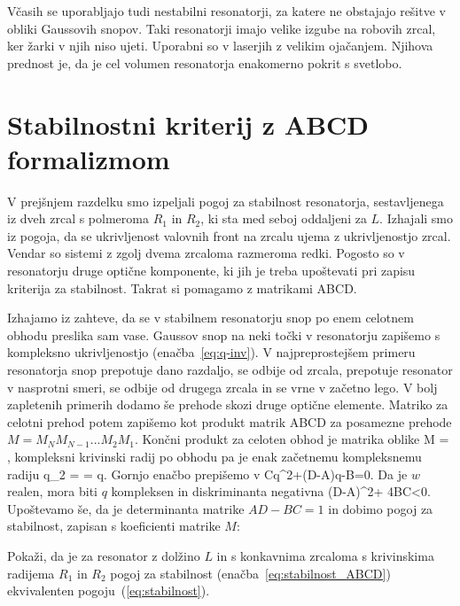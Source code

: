 \begin{remark}
Včasih se uporabljajo tudi nestabilni resonatorji, za 
katere ne obstajajo rešitve v obliki Gaussovih snopov. Taki resonatorji 
imajo velike izgube na robovih zrcal, ker žarki v njih niso ujeti. 
Uporabni so v laserjih z velikim ojačanjem. Njihova prednost je, da je cel
volumen resonatorja enakomerno pokrit s svetlobo.
\end{remark}

\section{Stabilnostni kriterij z ABCD formalizmom}
V prejšnjem razdelku smo izpeljali pogoj za stabilnost resonatorja, 
sestavljenega iz dveh zrcal s polmeroma $R_1$ in $R_2$, ki sta med 
seboj oddaljeni za $L$. Izhajali smo iz pogoja, da se ukrivljenost
valovnih front na zrcalu ujema z ukrivljenostjo zrcal. Vendar so sistemi z
zgolj dvema zrcaloma razmeroma redki. Pogosto so v resonatorju
druge optične komponente, ki jih je treba upoštevati pri zapisu
kriterija za stabilnost. Takrat si pomagamo z matrikami ABCD. 

Izhajamo iz zahteve, da se v stabilnem resonatorju snop po enem celotnem obhodu
preslika sam vase. Gaussov snop na neki točki v resonatorju 
zapišemo s kompleksno ukrivljenostjo (enačba~\ref{eq:q-inv}).
V najpreprostejšem primeru resonatorja snop prepotuje dano razdaljo, se odbije od zrcala, prepotuje
resonator v nasprotni smeri, se odbije od drugega zrcala in se vrne v začetno lego. V bolj 
zapletenih primerih dodamo še prehode skozi druge optične elemente. Matriko 
za celotni prehod potem zapišemo kot produkt matrik ABCD za posamezne prehode $M = M_N M_{N-1} ...M_2 M_1$.
Končni produkt za celoten obhod je matrika oblike
\beq
M = \left[\begin{array}{cc}
A & B\\
C & D
\end{array}\right],
\eeq
kompleksni krivinski radij po obhodu pa je enak začetnemu kompleksnemu radiju
\beq
q_2 =  = q.
\eeq
Gornjo enačbo prepišemo v 
\beq
Cq^2+(D-A)q-B=0.
\eeq
Da je $w$ realen, mora biti $q$ kompleksen in diskriminanta negativna
\beq
(D-A)^2+ 4BC<0.
\eeq
Upoštevamo še, da je determinanta matrike $AD-BC=1$ in dobimo pogoj za 
stabilnost, zapisan s koeficienti matrike $M$:

\begin{definition}
Pokaži, da je za resonator z dolžino $L$ in s konkavnima zrcaloma s krivinskima radijema $R_1$ in $R_2$ 
pogoj za stabilnost (enačba~\ref{eq:stabilnost_ABCD}) ekvivalenten pogoju~(\ref{eq:stabilnost}).
\end{definition}

